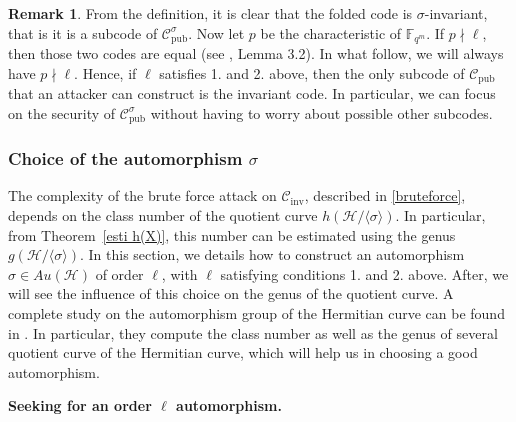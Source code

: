\documentclass[10pt]{article}
\theoremstyle{definition}
\newtheorem{rq1}[thm]{Remark}
\theoremstyle{definition}
\theoremstyle{definition}
\newcommand{\s}{\vspace{0.3cm}}
\newcommand{\C}{\mathcal{C}}
\newcommand{\fqm}{\mathbb{F}_{q^m}}
\newcommand{\h}{\mathcal{H}}
\begin{document}
\s

\begin{rq1} \label{un seul subcode} 
From the definition, it is clear that the folded code is $\sigma$-invariant, that is it is a subcode of $\C_{\mathrm{pub}}^{\sigma}$. Now let $p$ be the characteristic of $\fqm$. If $p \nmid \ell$, then those two codes are equal (see \cite{Bar1} , Lemma 3.2). In what follow, we will always have $p \nmid \ell$. Hence, if $\ell$ satisfies 1. and 2. above, then the only subcode of $\mathcal{C}_{\mathrm{pub}}$ that an attacker can construct is the invariant code. In particular, we can focus on the security of $\C_{\textrm{pub}}^{\sigma}$ without having to worry about possible other subcodes.  
\end{rq1}

\s

\subsubsection{Choice of the automorphism $\sigma$}

\s

The complexity of the brute force attack on $\C_{\textrm{inv}}$, described in \ref{bruteforce}, depends on the class number of the quotient curve $h(\mathcal{H}/\langle \sigma \rangle)$. In particular, from Theorem~\ref{esti h(X)}, this number can be estimated using the genus $g(\mathcal{H}/\langle \sigma \rangle)$. In this section, we details how to construct an automorphism $\sigma \in Au(\h)$ of order $\ell$, with $\ell$ satisfying conditions 1. and 2. above. After, we will see the influence of this choice on the genus of the quotient curve. A complete study on the automorphism group of the Hermitian curve can be found in \cite{Gar}. In particular, they compute the class number as well as the genus of several quotient curve of the Hermitian curve, which will help us in choosing a good automorphism.

\s

\textbf{Seeking for an order $\ell$ automorphism.}

\s 
\end{document}

